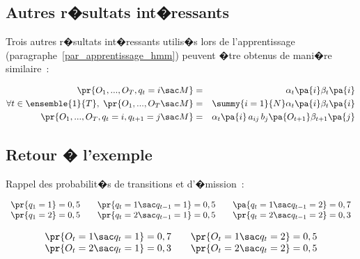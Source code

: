            










\subsection{Autres r�sultats int�ressants}


Trois autres r�sultats int�ressants utilis�s lors de l'apprentissage (paragraphe~\ref{par_apprentissage_hmm})
peuvent �tre obtenus de mani�re similaire~:

\label{hmm_probabilite_etat_transition_posteriori}%

        \begin{eqnarray}
        \pr{ O_1,...,O_T,q_t=i \sac  M }  &=& \alpha_t\pa {i}  \beta_t\pa{i} \label{hmm_proba_state}\\
        \forall t\in \ensemble{1}{T}, \; \pr{  O_{1},...,O_{T} \sac M }  &=& \summy{i=1}{N} \alpha_{t}\pa{i} \beta_{t} \pa{i}\\
        \pr{O_{1},...,O_{T},q_{t}=i,q_{t+1}=j \sac M} &=& \alpha_{t}\pa{i} \, a_{ij} \, b_{j}\pa{O_{t+1}}\beta_{t+1}\pa{j}
         \label{hmm_proba_transition}
        \end{eqnarray}









\subsection{Retour � l'exemple}

Rappel des probabilit�s de transitions et d'�mission~:%

        $$
        \begin{array}[c]{ccccc}%
        \pr{q_{1}=1}  =0,5 &  & \pr{q_{t}=1 \sac q_{t-1}=1}  =0,5 &  & \pa{q_{t}=1 \sac  q_{t-1}=2}  =0,7\\
        \pr{q_{1}=2}  =0,5 &  & \pr{q_{t}=2 \sac q_{t-1}=1}  =0,5 &  & \pr{q_{t}=2 \sac  q_{t-1}=2}  =0,3
        \end{array}
        $$
        
        $$
        \begin{array}[c]{ccc}%
        \pr{O_{t}=1 \sac q_{t}=1 }  =0,7 &  & \pr{O_{t}=1 \sac q_{t}=2 }  =0,5\\
        \pr{O_{t}=2 \sac q_{t}=1 }  =0,3 &  & \pr{O_{t}=2 \sac q_{t}=2 }  =0,5
        \end{array}
        $$

